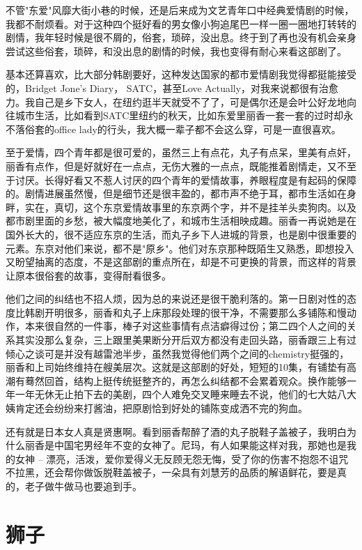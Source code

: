 \documentclass[12pt]{book}
\begin{document}
不管"东爱"风靡大街小巷的时候，还是后来成为文艺青年口中经典爱情剧的时候，我都不耐烦看。对于这种四个挺好看的男女像小狗追尾巴一样一圈一圈地打转转的剧情，我年轻时候是很不屑的，俗套，琐碎，没出息。终于到了再也没有机会亲身尝试这些俗套，琐碎，和没出息的剧情的时候，我也变得有耐心来看这部剧了。

基本还算喜欢，比大部分韩剧要好，这种发达国家的都市爱情剧我觉得都挺能接受的，Bridget Jone's Diary， SATC，甚至Love Actually，对我来说都很有治愈力。我自己是乡下女人，在纽约逛半天就受不了了，可是偶尔还是会叶公好龙地向往城市生活，比如看到SATC里纽约的秋天，比如东爱里丽香一套一套的过时却永不落俗套的office lady的行头，我大概一辈子都不会这么穿，可是一直很喜欢。

至于爱情，四个青年都是很可爱的，虽然三上有点花，丸子有点呆，里美有点奸，丽香有点作，但是好就好在一点点，无伤大雅的一点点，既能推着剧情走，又不至于讨厌。长得好看又不惹人讨厌的四个青年的爱情故事，养眼程度是有起码的保障的。剧情进展虽然慢，但是细节还是很丰盈的，都市声不绝于耳，都市生活如在身畔，实在，真切，这个东京爱情故事里的东京两个字，并不是挂羊头卖狗肉。以及都市剧里面的乡愁，被大幅度地美化了，和城市生活相映成趣。丽香一再说她是在国外长大的，很不适应东京的生活，而丸子乡下人进城的背景，也是剧中很重要的元素。东京对他们来说，都不是"原乡"。他们对东京那种既陌生又熟悉，即想投入又盼望抽离的态度，不是这部剧的重点所在，却是不可更换的背景，而这样的背景让原本很俗套的故事，变得耐看很多。

他们之间的纠结也不招人烦，因为总的来说还是很干脆利落的。第一日剧对性的态度比韩剧开明很多，丽香和丸子上床那段处理的很干净，不需要那么多铺陈和慢动作，本来很自然的一件事，棒子对这些事情有点洁癖得过份；第二四个人之间的关系其实没那么复杂，三上跟里美果断分开后双方都没有走回头路，丽香跟三上有过倾心之谈可是并没有越雷池半步，虽然我觉得他们两个之间的chemistry挺强的，丽香和上司始终维持在艘美层次。这就是这部剧的好处，短短的10集，有铺垫有高潮有蓦然回首，结构上挺传统挺整齐的，再怎么纠结都不会累着观众。换作能够一年一年无休无止拍下去的美剧，四个人难免交叉睡来睡去不说，他们的七大姑八大姨肯定还会纷纷来打酱油，把原剧恰到好处的铺陈变成洒不完的狗血。

还有就是日本女人真是贤惠啊。看到丽香帮醉了酒的丸子脱鞋子盖被子，我明白为什么丽香是中国宅男经年不变的女神了。尼玛，有人如果能这样对我，那她也是我的女神 -- 漂亮，活泼，爱你爱得义无反顾无怨无悔，受了你的伤害不抱怨不诅咒不拉黑，还会帮你做饭脱鞋盖被子，一朵具有刘慧芳的品质的解语鲜花，要是真的，老子做牛做马也要追到手。

\chapter{狮子}
\label{sec-46}
\end{document}
